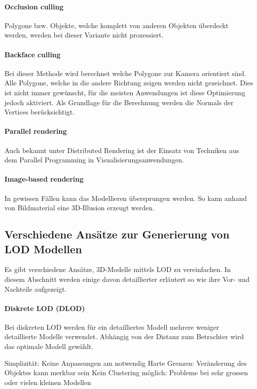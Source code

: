 \paragraph{Occlusion culling}
Polygone bzw. Objekte, welche komplett von anderen Objekten überdeckt werden, werden bei dieser Variante nicht prozessiert.

\paragraph{Backface culling}
\label{chap:backfaceCulling}
Bei dieser Methode wird berechnet welche Polygone zur Kamera orientiert sind.
Alle Polygone, welche in die andere Richtung zeigen werden nicht gezeichnet.
Dies ist nicht immer gewünscht, für die meisten Anwendungen ist diese Optimierung jedoch aktiviert.
Als Grundlage für die Berechnung werden die Normals der Vertices berücksichtigt.

\paragraph{Parallel rendering}
Auch bekannt unter Distributed Rendering ist der Einsatz von Techniken aus dem Parallel Programming in Visualisierungsanwendungen.

\paragraph{Image-based rendering}
In gewissen Fällen kann das Modellieren übersprungen werden. So kann anhand von Bildmaterial eine 3D-Illusion erzeugt werden.

\subsection{Verschiedene Ansätze zur Generierung von LOD Modellen}
Es gibt verschiedene Ansätze, 3D-Modelle mittels LOD zu vereinfachen. In diesem Abschnitt werden einige davon detaillierter erläutert so wie ihre Vor- und Nachteile aufgezeigt.

\paragraph{Diskrete LOD (DLOD)}
Bei diskreten LOD werden für ein detailliertes Modell mehrere weniger detaillierte Modelle verwendet.
Abhängig von der Distanz zum Betrachter wird das optimale Modell gewählt.
\begin{itemize}
  \pro Simplizität: Keine Anpassungen am  notwendig
  \con Harte Grenzen: Veränderung des Objektes kann merkbar sein
  \con Kein Clustering möglich: Probleme bei sehr grossen oder vielen kleinen Modellen
\end{itemize}

